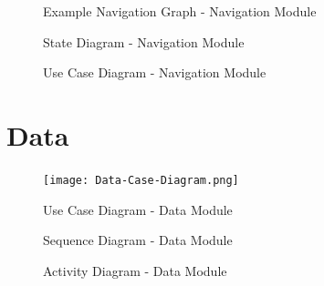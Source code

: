 \documentclass[english]{article}
\begin{document}
        \begin{figure}[H]
            \centering	            
            \centerline{}
            \caption{Example Navigation Graph - Navigation Module}
        \end{figure}

        \begin{figure}[H]
            \centering	            
            \centerline{}
            \caption{State Diagram - Navigation Module}
        \end{figure}

        \begin{figure}[H]
            \centering	            
            \centerline{}
            \caption{Use Case Diagram - Navigation Module}
        \end{figure}

    \newpage
    \section{Data}
        \begin{figure}[H]
            \centering	            
            \centerline{\texttt{[image: Data-Case-Diagram.png]}}
            \caption{Use Case Diagram - Data Module}
        \end{figure}
        
        \begin{figure}[H]
            \centering	            
            \centerline{}
            \caption{Sequence Diagram - Data Module}
        \end{figure} 

        \begin{figure}[H]
            \centering	            
            \centerline{}
            \caption{Activity Diagram - Data Module}

        \end{figure} 
        
\end{document}
